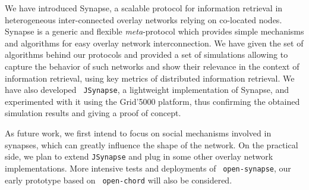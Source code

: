 
We have introduced Synapse, a scalable protocol for information
retrieval in heterogeneous inter-connected overlay networks relying on
co-located nodes.  Synapse is a generic and flexible
\emph{meta}-protocol which provides simple mechanisms and algorithms
for easy overlay network interconnection. We have given the set of
algorithms behind our protocols and provided a set of simulations
allowing to capture the behavior of such networks and show their
relevance in the context of information retrieval, using key metrics
of distributed information retrieval. We have also developed {\tt
JSynapse}, a lightweight implementation of Synapse, and experimented
with it using the Grid'5000 platform, thus confirming the obtained
simulation results and giving a proof of concept. %

As future work, we first intend to focus on social mechanisms involved
in synapses, which can greatly influence the shape of the network. On
the practical side, we plan to extend {\tt JSynapse} and plug in some
other overlay network implementations. More intensive tests and
deployments of {~\tt{open-synapse}}, our early prototype based on {\tt
open-chord} will also be considered.
